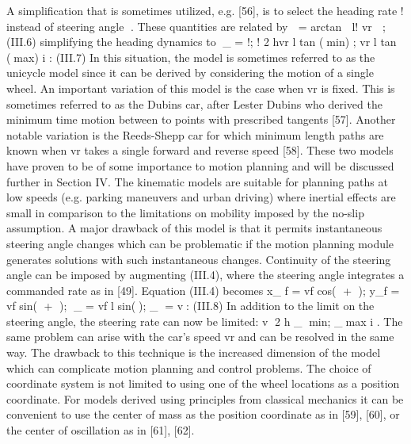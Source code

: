 \documentclass[a4paper,10pt]{article}
\begin{document}
A simplification that is sometimes utilized, e.g. [56], is to select the heading rate ! instead of steering angle . These quantities are related by  = arctan  l! vr  ; (III.6) simplifying the heading dynamics to _ = !; ! 2 hvr l tan (min) ; vr l tan (max) i : (III.7) In this situation, the model is sometimes referred to as the unicycle model since it can be derived by considering the motion of a single wheel. An important variation of this model is the case when vr is fixed. This is sometimes referred to as the Dubins car, after Lester Dubins who derived the minimum time motion between to points with prescribed tangents [57]. Another notable variation is the Reeds-Shepp car for which minimum length paths are known when vr takes a single forward and reverse speed [58]. These two models have proven to be of some importance to motion planning and will be discussed further in Section IV. The kinematic models are suitable for planning paths at low speeds (e.g. parking maneuvers and urban driving) where inertial effects are small in comparison to the limitations on mobility imposed by the no-slip assumption. A major drawback of this model is that it permits instantaneous steering angle changes which can be problematic if the motion planning module generates solutions with such instantaneous changes. Continuity of the steering angle can be imposed by augmenting (III.4), where the steering angle integrates a commanded rate as in [49]. Equation (III.4) becomes x_ f = vf cos( + ); y_f = vf sin( + ); _ = vf l sin(); _ = v: (III.8) In addition to the limit on the steering angle, the steering rate can now be limited: v 2 h _ min; _max i . The same problem can arise with the car’s speed vr and can be resolved in the same way. The drawback to this technique is the increased dimension of the model which can complicate motion planning and control problems. The choice of coordinate system is not limited to using one of the wheel locations as a position coordinate. For models derived using principles from classical mechanics it can be convenient to use the center of mass as the position coordinate as in [59], [60], or the center of oscillation as in [61], [62].
\end{document}
